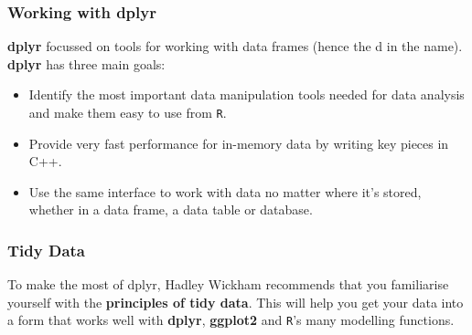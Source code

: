 \documentclass{beamer}
\begin{document}
\begin{frame}
	
	\frametitle{Working with dplyr} \textbf{dplyr} focussed on tools for working with data frames (hence the d in the name). 
\textbf{dplyr} has three main goals:

\begin{itemize}
	\item Identify the most important data manipulation tools needed for data analysis and make them easy to use from \texttt{R}.
	
	\item Provide very fast performance for in-memory data by writing key pieces in C++.
	
	\item Use the same interface to work with data no matter where it's stored, whether in a data frame, a data table or database.
\end{itemize}
\end{frame}
%	
\begin{frame}
\frametitle{Tidy Data}
To make the most of dplyr, Hadley Wickham recommends that you familiarise yourself with the \textbf{principles of tidy data}. This will help you get your data into a form that works well with \textbf{dplyr}, \textbf{ggplot2} and \texttt{R}'s many modelling functions.\\
\end{frame}
\end{document}
